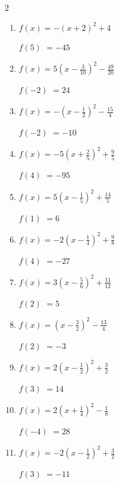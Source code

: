 \begin{multicols}{2}
\begin{enumerate}
$f(-5)$
        $=-103$

  \item $\displaystyle f(x)=-\left( x+2\right)^{2}+4$

$f(5)$
        $=-45$

\columnbreak %

  \item $\displaystyle f(x)=5\left( x-\frac{3}{10}\right)^{2}-\frac{49}{20}$

$f(-2)$
        $=24$

  \item $\displaystyle f(x)=-\left( x-\frac{1}{2}\right)^{2}-\frac{15}{4}$

$f(-2)$
        $=-10$

  \item $\displaystyle f(x)=-5\left( x+\frac{2}{5}\right)^{2}+\frac{9}{5}$

$f(4)$
        $=-95$

  \item $\displaystyle f(x)=5\left( x-\frac{1}{5}\right)^{2}+\frac{14}{5}$

$f(1)$
        $=6$

  \item $\displaystyle f(x)=-2\left( x-\frac{1}{4}\right)^{2}+\frac{9}{8}$

$f(4)$
        $=-27$

\columnbreak %

\resetques

  \item $\displaystyle f(x)=3\left( x-\frac{5}{6}\right)^{2}+\frac{11}{12}$

$f(2)$
        $=5$

  \item $\displaystyle f(x)=\left( x-\frac{3}{2}\right)^{2}-\frac{13}{4}$

$f(2)$
        $=-3$

  \item $\displaystyle f(x)=2\left( x-\frac{1}{2}\right)^{2}+\frac{3}{2}$

$f(3)$
        $=14$

  \item $\displaystyle f(x)=2\left( x+\frac{1}{4}\right)^{2}-\frac{1}{8}$

$f(-4)$
        $=28$

  \item $\displaystyle f(x)=-2\left( x-\frac{1}{2}\right)^{2}+\frac{3}{2}$

$f(3)$
        $=-11$


\end{enumerate}
\end{multicols}
